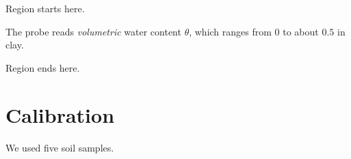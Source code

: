 \documentclass[11pt]{article}
\begin{document}
Region starts here.

\begin{mdframed}
The probe reads \emph{volumetric} water content $\theta$, which ranges from $0$ to about $0.5$ in clay.
\end{mdframed}

Region ends here.

\section{Calibration}
We used five soil samples.
\end{document}
